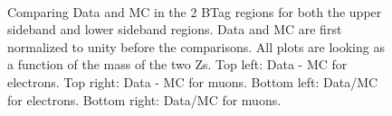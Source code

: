 \begin{figure}[htb!]
{\\
}
\caption{Comparing Data and MC in the 2 BTag regions for both the upper sideband and lower sideband regions. Data and MC are first normalized to unity before the comparisons. All plots are looking as a function of the mass of the two Zs. Top left: Data - MC for electrons.  Top right: Data - MC for muons.  Bottom left: Data/MC for electrons.  Bottom right: Data/MC for muons.
\label{fig:2tag_sideband_up_down}}  
\end{figure}






